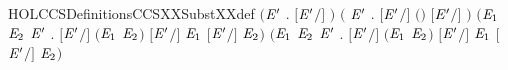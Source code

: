 \begin{SaveVerbatim}{HOLCCSDefinitionsCCSXXSubstXXdef}
\HOLTokenTurnstile{} \ensuremath{(}\HOLSymConst{\HOLTokenForall{}}\ensuremath{\HOLBoundVar{E}\sp{\prime{}}} . \ensuremath{[}\ensuremath{\HOLBoundVar{E}\sp{\prime{}}}\ensuremath{/}\ensuremath{]}  \HOLSymConst{\ensuremath{=}} \ensuremath{)} \HOLSymConst{\HOLTokenConj{}}
   \ensuremath{(}\HOLSymConst{\HOLTokenForall{}}  \ensuremath{\HOLBoundVar{E}\sp{\prime{}}} . \ensuremath{[}\ensuremath{\HOLBoundVar{E}\sp{\prime{}}}\ensuremath{/}\ensuremath{]} \ensuremath{(}\HOLSymConst{\ensuremath{\ldotp}}\ensuremath{)} \HOLSymConst{\ensuremath{=}} \HOLSymConst{\ensuremath{\ldotp}}\ensuremath{[}\ensuremath{\HOLBoundVar{E}\sp{\prime{}}}\ensuremath{/}\ensuremath{]} \ensuremath{)} \HOLSymConst{\HOLTokenConj{}}
   \ensuremath{(}\HOLSymConst{\HOLTokenForall{}}\ensuremath{\HOLBoundVar{E}\sb{\mathrm{1}}} \ensuremath{\HOLBoundVar{E}\sb{\mathrm{2}}} \ensuremath{\HOLBoundVar{E}\sp{\prime{}}} . \ensuremath{[}\ensuremath{\HOLBoundVar{E}\sp{\prime{}}}\ensuremath{/}\ensuremath{]} \ensuremath{(}\ensuremath{\HOLBoundVar{E}\sb{\mathrm{1}}} \HOLSymConst{\ensuremath{+}} \ensuremath{\HOLBoundVar{E}\sb{\mathrm{2}}}\ensuremath{)} \HOLSymConst{\ensuremath{=}} \ensuremath{[}\ensuremath{\HOLBoundVar{E}\sp{\prime{}}}\ensuremath{/}\ensuremath{]} \ensuremath{\HOLBoundVar{E}\sb{\mathrm{1}}} \HOLSymConst{\ensuremath{+}} \ensuremath{[}\ensuremath{\HOLBoundVar{E}\sp{\prime{}}}\ensuremath{/}\ensuremath{]} \ensuremath{\HOLBoundVar{E}\sb{\mathrm{2}}}\ensuremath{)} \HOLSymConst{\HOLTokenConj{}}
   \ensuremath{(}\HOLSymConst{\HOLTokenForall{}}\ensuremath{\HOLBoundVar{E}\sb{\mathrm{1}}} \ensuremath{\HOLBoundVar{E}\sb{\mathrm{2}}} \ensuremath{\HOLBoundVar{E}\sp{\prime{}}} . \ensuremath{[}\ensuremath{\HOLBoundVar{E}\sp{\prime{}}}\ensuremath{/}\ensuremath{]} \ensuremath{(}\ensuremath{\HOLBoundVar{E}\sb{\mathrm{1}}} \HOLSymConst{\ensuremath{\mid}} \ensuremath{\HOLBoundVar{E}\sb{\mathrm{2}}}\ensuremath{)} \HOLSymConst{\ensuremath{=}} \ensuremath{[}\ensuremath{\HOLBoundVar{E}\sp{\prime{}}}\ensuremath{/}\ensuremath{]} \ensuremath{\HOLBoundVar{E}\sb{\mathrm{1}}} \HOLSymConst{\ensuremath{\mid}} \ensuremath{[}\ensuremath{\HOLBoundVar{E}\sp{\prime{}}}\ensuremath{/}\ensuremath{]} \ensuremath{\HOLBoundVar{E}\sb{\mathrm{2}}}\ensuremath{)} \HOLSymConst{\HOLTokenConj{}}

\end{SaveVerbatim}
